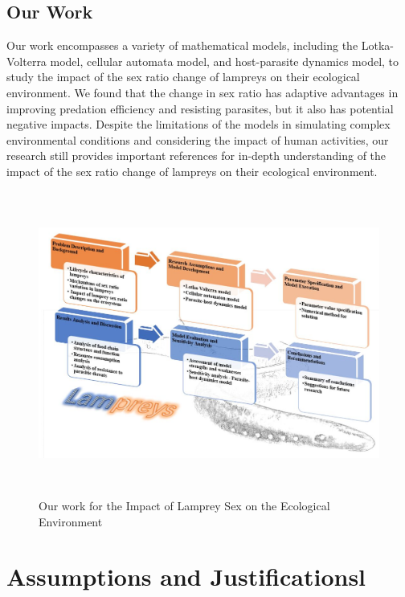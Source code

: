 \documentclass[CTeX = true]{mcmthesis}  %
\begin{document}
\subsection{Our Work}
Our work encompasses a variety of mathematical models, including the Lotka-Volterra model, cellular automata model, and host-parasite dynamics model, to study the impact of the sex ratio change of lampreys on their ecological environment. We found that the change in sex ratio has adaptive advantages in improving predation efficiency and resisting parasites, but it also has potential negative impacts. Despite the limitations of the models in simulating complex environmental conditions and considering the impact of human activities, our research still provides important references for in-depth understanding of the impact of the sex ratio change of lampreys on their ecological environment.
\begin{figure}[htbp]
       \centering    
   \includegraphics[width=15cm,height=10cm]{our work e}
     \caption{Our work for the Impact of Lamprey Sex on the Ecological Environment}
     \label{fig:Our work for the Impact of Lamprey Sex on the Ecological Environment}
\end{figure}

\section{Assumptions and Justificationsl}
\end{document}
